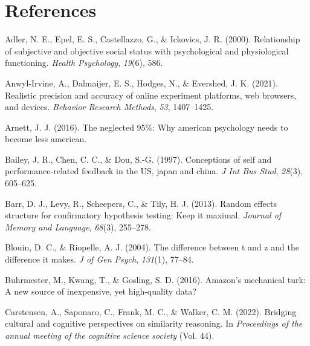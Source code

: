 \documentclass[
  man,floatsintext]{apa6}
\newlength{\cslhangindent}
\newlength{\cslentryspacingunit} %
\newenvironment{CSLReferences}[2] %
 {%
  \setlength{\parindent}{0pt}
  \ifodd #1
  \let\oldpar\par
  \def\par{\hangindent=\cslhangindent\oldpar}
  \fi
  \setlength{\parskip}{#2\cslentryspacingunit}
 }%
 {}
\begin{document}
\setlength{\parindent}{-0.5in}
\setlength{\leftskip}{0.5in}

\newpage

\hypertarget{references}{%
\section{References}\label{references}}

\hypertarget{refs}{}
\begin{CSLReferences}{1}{0}
\leavevmode{}%
Adler, N. E., Epel, E. S., Castellazzo, G., \& Ickovics, J. R. (2000). Relationship of subjective and objective social status with psychological and physiological functioning. \emph{Health Psychology}, \emph{19}(6), 586.

\leavevmode{}%
Anwyl-Irvine, A., Dalmaijer, E. S., Hodges, N., \& Evershed, J. K. (2021). Realistic precision and accuracy of online experiment platforms, web browsers, and devices. \emph{Behavior Research Methods}, \emph{53}, 1407--1425.

\leavevmode{}%
Arnett, J. J. (2016). The neglected 95\%: Why american psychology needs to become less american.

\leavevmode{}%
Bailey, J. R., Chen, C. C., \& Dou, S.-G. (1997). Conceptions of self and performance-related feedback in the US, japan and china. \emph{J Int Bus Stud}, \emph{28}(3), 605--625.

\leavevmode{}%
Barr, D. J., Levy, R., Scheepers, C., \& Tily, H. J. (2013). Random effects structure for confirmatory hypothesis testing: Keep it maximal. \emph{Journal of Memory and Language}, \emph{68}(3), 255--278.

\leavevmode{}%
Blouin, D. C., \& Riopelle, A. J. (2004). The difference between t and z and the difference it makes. \emph{J of Gen Psych}, \emph{131}(1), 77--84.

\leavevmode{}%
Buhrmester, M., Kwang, T., \& Gosling, S. D. (2016). Amazon's mechanical turk: A new source of inexpensive, yet high-quality data?

\leavevmode{}%
Carstensen, A., Saponaro, C., Frank, M. C., \& Walker, C. M. (2022). Bridging cultural and cognitive perspectives on similarity reasoning. In \emph{Proceedings of the annual meeting of the cognitive science society} (Vol. 44).


\end{CSLReferences}
\end{document}
